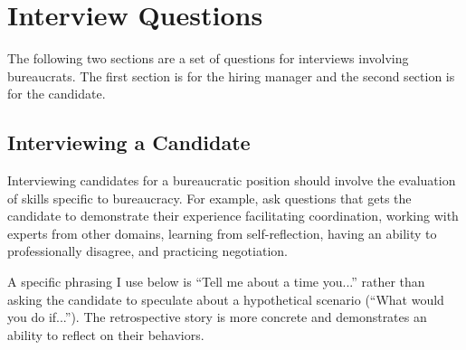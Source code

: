 \chapter{Interview Questions}

The following two sections are a set of questions for interviews involving bureaucrats. The first section is for the hiring manager and the second section is for the candidate.


\section{Interviewing a Candidate}

Interviewing candidates for a bureaucratic position should involve the evaluation of skills specific to bureaucracy. For example, ask questions that gets the candidate to demonstrate  their experience facilitating coordination, working with experts from other domains, learning from self-reflection, having an ability to professionally disagree, and practicing negotiation. 

A specific phrasing I use below is ``Tell me about a time you...'' rather than asking the candidate to speculate about a hypothetical scenario (``What would you do if...''). The retrospective story is more concrete and demonstrates an ability to reflect on their behaviors.


